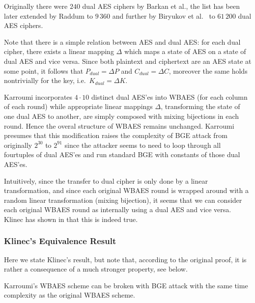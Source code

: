 	Originally there were $240$ dual AES ciphers by Barkan et al., the list has been later extended by Raddum \cite{raddum2004more} to $9\,360$ and further by Biryukov et al.\ \cite{biryukov2003toolbox} to $61\,200$ dual AES ciphers.
	
	Note that there is a simple relation between AES and dual AES: for each dual cipher, there exists a linear mapping $\Delta$ which maps a state of AES on a state of dual AES and vice versa. Since both plaintext and ciphertext are an AES state at some point, it follows that $P_{dual} = \Delta P$ and $C_{dual} = \Delta C$, moreover the same holds nontrivially for the key, i.e.\ $K_{dual} = \Delta K$.
	
	Karroumi incorporates $4\cdot 10$ distinct dual AES'es into WBAES (for each column of each round) while appropriate linear mappings $\Delta$, transforming the state of one dual AES to another, are simply composed with mixing bijections in each round. Hence the overal structure of WBAES remains unchanged. Karroumi presumes that this modification raises the complexity of BGE attack from originally $2^{30}$ to $2^{91}$ since the attacker seems to need to loop through all fourtuples of dual AES'es and run standard BGE with constants of those dual AES'es.
	
	Intuitively, since the transfer to dual cipher is only done by a linear transformation, and since each original WBAES round is wrapped around with a random linear transformation (mixing bijection), it seems that we can consider each original WBAES round as internally using a dual AES and vice versa. Klinec has shown in \cite[Proposition~2]{klinec2013white} that this is indeed true.

\subsubsection{Klinec's Equivalence Result}
	
	Here we state Klinec's result, but note that, according to the original proof, it is rather a consequence of a much stronger property, see below.
	
	\begin{prop}[Klinec]
	\label{thm:dualequiv}
		Karroumi's WBAES scheme can be broken with BGE attack with the same time complexity as the original WBAES scheme.
	\end{prop}
	
